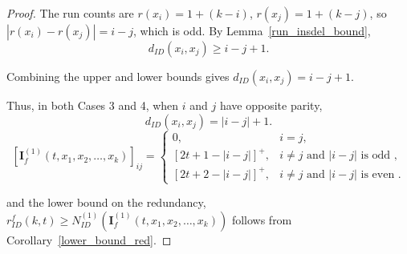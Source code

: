 \documentclass[10pt,a4paper]{amsart}
\begin{document}
\begin{proof}
    The run counts are $r(x_i)=1+(k-i)$, $r(x_j)=1+(k-j)$, so $|r(x_i)-r(x_j)| = i-j$, which is odd. 
    By Lemma~\ref{run_insdel_bound},
    \[
    d_{ID}(x_i,x_j) \ge i - j + 1.
    \]

    \noindent
    Combining the upper and lower bounds gives $d_{ID}(x_i,x_j) = i - j + 1$.


    \noindent
    Thus, in both Cases 3 and 4, when $i$ and $j$ have opposite parity,  
    \[
        d_{ID}(x_i, x_j) = |i - j| + 1.
    \]
    \[
            [\boldsymbol{I}_f^{(1)}(t, x_1, x_2, \ldots, x_k)]_{ij}=
            \begin{cases}
                0,  & i = j, \\[4pt]
                [2t + 1 - |i - j|]^+ , & i \neq j \text{ and } |i-j| \text{ is odd },\\
                [2t + 2 - |i-j|]^+,    & i \neq j \text{ and } |i-j| \text{ is even }. 
            \end{cases}
        \]
        
        and the lower bound on the redundancy, $r_{ID}^f(k,t) \geq N_{ID}^{(1)}(\boldsymbol{I}_f^{(1)}(t, x_1, x_2, \ldots, x_k))$ follows from Corollary~\ref{lower_bound_red}.
    
    \end{proof}
\end{document}
